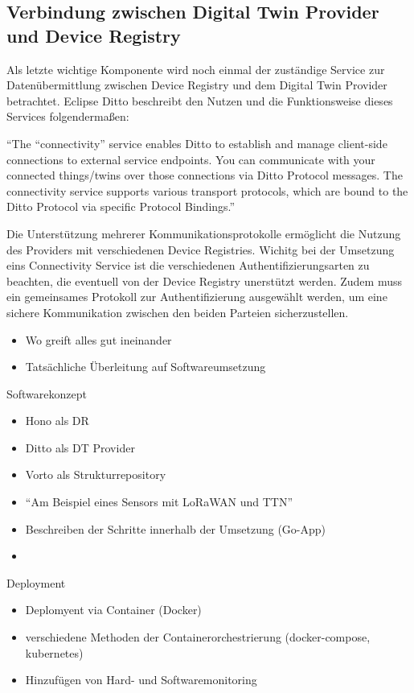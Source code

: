 \subsection{Verbindung zwischen Digital Twin Provider und Device Registry}

Als letzte wichtige Komponente wird noch einmal der zuständige Service zur Datenübermittlung zwischen Device Registry und dem Digital Twin Provider betrachtet. Eclipse Ditto beschreibt den Nutzen und die Funktionsweise dieses Services folgendermaßen:

\enquote{The “connectivity” service enables Ditto to establish and manage client-side connections to external service endpoints. You can communicate with your connected things/twins over those connections via Ditto Protocol messages. The connectivity service supports various transport protocols, which are bound to the Ditto Protocol via specific Protocol Bindings.}\autocite{ditto}

Die Unterstützung mehrerer Kommunikationsprotokolle ermöglicht die Nutzung des Providers mit verschiedenen Device Registries. Wichitg bei der Umsetzung eins Connectivity Service ist die verschiedenen Authentifizierungsarten zu beachten, die eventuell von der Device Registry unerstützt werden. Zudem muss ein gemeinsames Protokoll zur Authentifizierung ausgewählt werden, um eine sichere Kommunikation zwischen den beiden Parteien sicherzustellen.

\begin{itemize}
    \item Wo greift alles gut ineinander
    \item Tatsächliche Überleitung auf Softwareumsetzung
\end{itemize}

\large{Softwarekonzept}
\normalsize
\begin{itemize}
    \item Hono als DR
    \item Ditto als DT Provider
    \item Vorto als Strukturrepository
    \item \enquote{Am Beispiel eines Sensors mit LoRaWAN und TTN}
    \item Beschreiben der Schritte innerhalb der Umsetzung (Go-App)
    \item 
\end{itemize}

\large{Deployment}
\normalsize
\begin{itemize}
    \item Deplomyent via Container (Docker)
    \item verschiedene Methoden der Containerorchestrierung (docker-compose, kubernetes)
    \item Hinzufügen von Hard- und Softwaremonitoring
\end{itemize}
